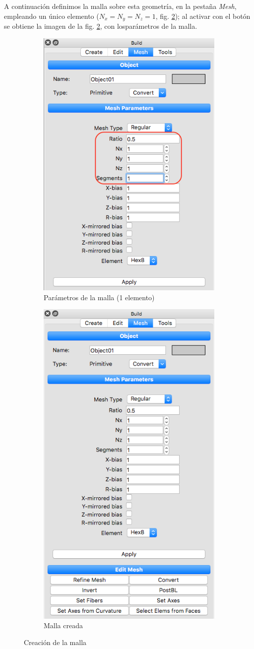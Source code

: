 A continuación definimos la malla sobre esta geometría, en la pestaña \emph{Mesh}, empleando un único elemento ($N_{x}=N_{y}=N_{z}=1$, fig. \ref{fig:pre-02}); al activar con el botón  se obtiene la imagen de la fig. \ref{fig:pre-02}, con losparámetros de la malla.
\begin{figure}[!htp]
\centering
\begin{subfigure}[b]{0.48\textwidth}
\centering
\includegraphics[width=0.5\linewidth]{figuras_3/scr-pre-02m.png}
\caption{Parámetros de la malla (1 elemento)}
\label{fig:pre-02}
\end{subfigure}
\begin{subfigure}[b]{0.48\textwidth}
\centering
\includegraphics[width=0.5\linewidth]{figuras_3/scr-pre-03.png}
\caption{Malla creada}
\label{fig:pre-02}
\end{subfigure}
\caption{Creación de la malla}
\label{fig:pre-02-03}
\end{figure}

